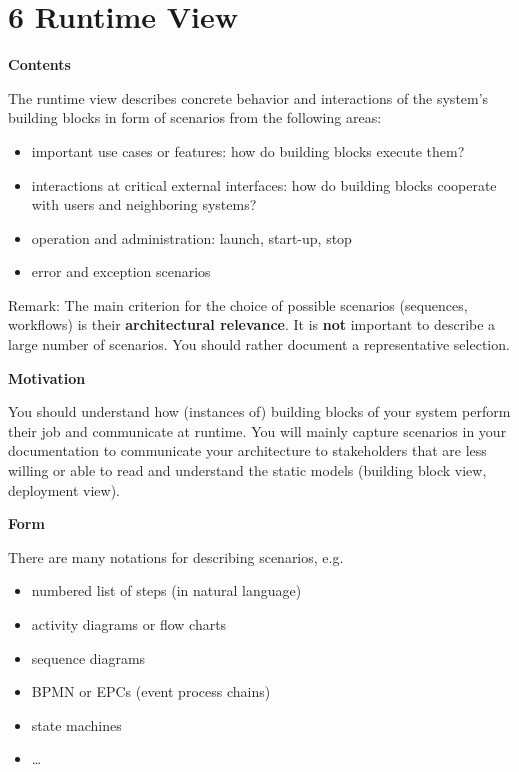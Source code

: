 \hypertarget{section-runtime-view}{%
\section{6 Runtime View}\label{section-runtime-view}}

\textbf{Contents}

The runtime view describes concrete behavior and interactions of the
system's building blocks in form of scenarios from the following areas:

\begin{itemize}
\item
  important use cases or features: how do building blocks execute them?
\item
  interactions at critical external interfaces: how do building blocks
  cooperate with users and neighboring systems?
\item
  operation and administration: launch, start-up, stop
\item
  error and exception scenarios
\end{itemize}

Remark: The main criterion for the choice of possible scenarios
(sequences, workflows) is their \textbf{architectural relevance}. It is
\textbf{not} important to describe a large number of scenarios. You
should rather document a representative selection.

\textbf{Motivation}

You should understand how (instances of) building blocks of your system
perform their job and communicate at runtime. You will mainly capture
scenarios in your documentation to communicate your architecture to
stakeholders that are less willing or able to read and understand the
static models (building block view, deployment view).

\textbf{Form}

There are many notations for describing scenarios, e.g.

\begin{itemize}
\item
  numbered list of steps (in natural language)
\item
  activity diagrams or flow charts
\item
  sequence diagrams
\item
  BPMN or EPCs (event process chains)
\item
  state machines
\item
  \ldots{}
\end{itemize}

